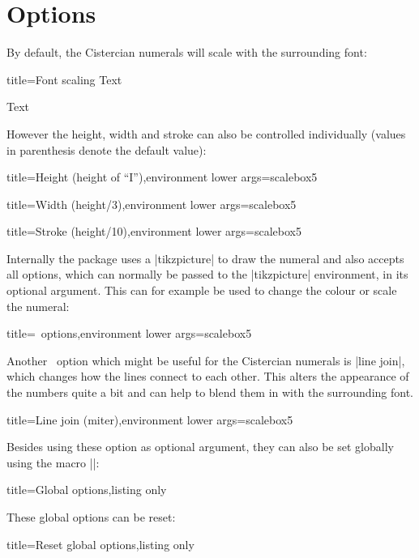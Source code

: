 \documentclass{scrartcl}
\begin{document}
\section{Options}

By default, the Cistercian numerals will scale with the surrounding font:
\begin{tcblisting}{title={Font scaling}}
 Text

\Huge {} Text
\end{tcblisting}

However the height, width and stroke can also be controlled individually (values in parenthesis denote the default value):
\begin{tcblisting}{title={Height (height of ``I'')},environment lower args={scalebox}{5}}
\end{tcblisting}
\begin{tcblisting}{title={Width (height/3)},environment lower args={scalebox}{5}}
\end{tcblisting}
\begin{tcblisting}{title={Stroke (height/10)},environment lower args={scalebox}{5}}
\end{tcblisting}

Internally the package uses a \saminline|tikzpicture| to draw the numeral and also accepts all options, which can normally be passed to the \saminline|tikzpicture| environment, in its optional argument. This can for example be used to change the colour or scale the numeral:
\begin{tcblisting}{title={\TikZ\ options},environment lower args={scalebox}{5}}
\end{tcblisting}

Another \TikZ\ option which might be useful for the Cistercian numerals is \saminline|line join|, which changes how the lines connect to each other. This alters the appearance of the numbers quite a bit and can help to blend them in with the surrounding font.
\begin{tcblisting}{title={Line join (miter)},environment lower args={scalebox}{5}}
\end{tcblisting}

Besides using these option as optional argument, they can also be set globally using the macro \saminline|\cistercianset|:
\begin{tcblisting}{title={Global options},listing only}
\end{tcblisting}

These global options can be reset:
\begin{tcblisting}{title={Reset global options},listing only}
\cistercianreset
\end{tcblisting}
\end{document}

